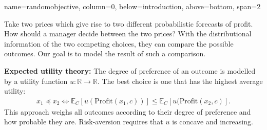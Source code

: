 \documentclass[a0paper,portrait,fontscale=0.35]{baposter}
\begin{document}
\begin{poster}
  {name=randomobjective, column=0, below=introduction, above=bottom, span=2}
  {
    Take two prices which give rise
    to two different probabilistic forecasts of profit. How should a manager decide between
    the two prices? With the distributional information of the two competing choices,
    they can compare the possible outcomes.
    Our goal is to model the result of such a comparison.

    \vspace{0.5em}
    \textbf{Expected utility theory:}
    The degree of preference of an outcome is modelled by a utility
    function $u:\mathbb R\to\mathbb R$. The best choice is one that
    has the highest average utility:
    \begin{align}
      x_1\preceq x_2 \Leftrightarrow
      \mathbb E_C[u(\mbox{Profit}(x_1,c))] \leq
      \mathbb E_C[u(\mbox{Profit}(x_2,c)].
    \end{align}
    This approach weighs all outcomes according to their degree of
    preference and how probable they are. Risk-aversion requires
    that $u$ is concave and increasing.

}
\end{poster}
\end{document}
